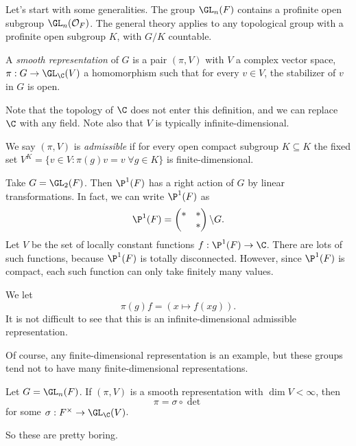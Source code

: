 \documentclass[a4paper]{article}
\begin{document}
Let's start with some generalities. The group $\GL_n(F)$ contains a profinite open subgroup $\GL_n(\mathcal{O}_F)$. The general theory applies to any topological group with a profinite open subgroup $K$, with $G/K$ countable.

\begin{defi}
  A \emph{smooth representation} of $G$ is a pair $(\pi, V)$ with $V$ a complex vector space, $\pi: G \to \GL_\C(V)$ a homomorphism such that for every $v \in V$, the stabilizer of $v$ in $G$ is open.
\end{defi}
Note that the topology of $\C$ does not enter this definition, and we can replace $\C$ with any field. Note also that $V$ is typically infinite-dimensional.

\begin{defi}
  We say $(\pi, V)$ is \emph{admissible} if for every open compact subgroup $K \subseteq K$ the fixed set $V^K = \{v \in V: \pi(g)v = v\;\forall g \in K\}$ is finite-dimensional.
\end{defi}

\begin{eg}
  Take $G = \GL_2(F)$. Then $\P^1(F)$ has a right action of $G$ by linear transformations. In fact, we can write $\P^1(F)$ as
  \[
    \P^1(F) =
    \begin{pmatrix}
      * & *\\
      & *
    \end{pmatrix} \backslash G.
  \]
  Let $V$ be the set of locally constant functions $f: \P^1(F) \to \C$. There are lots of such functions, because $\P^1(F)$ is totally disconnected. However, since $\P^1(F)$ is compact, each such function can only take finitely many values.

  We let
  \[
    \pi(g) f = (x \mapsto f(xg)).
  \]
  It is not difficult to see that this is an infinite-dimensional admissible representation.
\end{eg}
Of course, any finite-dimensional representation is an example, but these groups tend not to have many finite-dimensional representations.

\begin{prop}
  Let $G = \GL_n(F)$. If $(\pi, V)$ is a smooth representation with $\dim V < \infty$, then
  \[
    \pi = \sigma \circ \det
  \]
  for some $\sigma: F^\times \to \GL_\C(V)$.
\end{prop}
So these are pretty boring.
\end{document}
